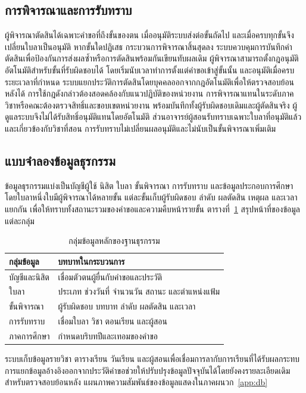 \subsection{การพิจารณาและการรับทราบ}
ผู้พิจารณาตัดสินได้เฉพาะคำขอที่ถึงขั้นของตน
เมื่ออนุมัติระบบส่งต่อขั้นถัดไป
และเมื่อครบทุกขั้นจึงเปลี่ยนใบลาเป็นอนุมัติ หากขั้นใดปฏิเสธ
กระบวนการพิจารณาสิ้นสุดลง
ระบบควบคุมการบันทึกคำตัดสินเพื่อป้องกันการส่งผลซ้ำหรือการตัดสินพร้อมกันเขียนทับผลเดิม
ผู้พิจารณาสามารถตั้งกฎอนุมัติอัตโนมัติสำหรับขั้นที่รับผิดชอบได้
โดยเริ่มนับเวลาทำการตั้งแต่คำขอเข้าสู่ขั้นนั้น
และอนุมัติเมื่อครบระยะเวลาที่กำหนด
ระบบแยกประวัติการตัดสินโดยบุคคลออกจากกฎอัตโนมัติเพื่อให้ตรวจสอบย้อนหลังได้
การใช้กฎดังกล่าวต้องสอดคล้องกับแนวปฏิบัติของหน่วยงาน
การพิจารณาแทนในระดับภาควิชาหรือคณะต้องตรวจสิทธิ์และขอบเขตหน่วยงาน
พร้อมบันทึกทั้งผู้รับผิดชอบเดิมและผู้ตัดสินจริง
ผู้ดูแลระบบจึงไม่ได้รับสิทธิ์อนุมัติแทนโดยอัตโนมัติ
ส่วนอาจารย์ผู้สอนรับทราบเฉพาะใบลาที่อนุมัติแล้วและเกี่ยวข้องกับวิชาที่สอน
การรับทราบไม่เปลี่ยนผลอนุมัติและไม่นับเป็นขั้นพิจารณาเพิ่มเติม
\subsection{แบบจำลองข้อมูลธุรกรรม}
ข้อมูลธุรกรรมแบ่งเป็นบัญชีผู้ใช้ นิสิต ใบลา ขั้นพิจารณา การรับทราบ
และข้อมูลประกอบการศึกษา โดยใบลาหนึ่งใบมีผู้พิจารณาได้หลายขั้น
แต่ละขั้นเก็บผู้รับผิดชอบ ลำดับ ผลตัดสิน เหตุผล และเวลาแยกกัน
เพื่อให้ทราบทั้งสถานะรวมของคำขอและความคืบหน้ารายขั้น
ตารางที่~\ref{tab:operational-model} สรุปหน้าที่ของข้อมูลแต่ละกลุ่ม
\begin{table}[H]
  \caption{กลุ่มข้อมูลหลักของฐานธุรกรรม}\label{tab:operational-model}
  \centering
  \begin{tabularx}{\columnwidth}{|p{23mm}|X|}
    \hline
    กลุ่มข้อมูล & บทบาทในกระบวนการ \\ \hline
    บัญชีและนิสิต & เชื่อมตัวตนผู้ยื่นกับคำขอและประวัติ \\ \hline
    ใบลา & ประเภท ช่วงวันที่ จำนวนวัน สถานะ และตำแหน่งแฟ้ม \\ \hline
    ขั้นพิจารณา & ผู้รับผิดชอบ บทบาท ลำดับ ผลตัดสิน และเวลา \\ \hline
    การรับทราบ & เชื่อมใบลา วิชา ตอนเรียน และผู้สอน \\ \hline
    ภาคการศึกษา & กำหนดบริบทปีและเทอมของคำขอ \\ \hline
  \end{tabularx}
\end{table}
ระบบเก็บข้อมูลรายวิชา ตารางเรียน วันเรียน
และผู้สอนเพื่อเชื่อมการลากับการเรียนที่ได้รับผลกระทบ
การแยกข้อมูลอ้างอิงออกจากประวัติคำขอช่วยให้ปรับปรุงข้อมูลปัจจุบันได้โดยยังคงรายละเอียดเดิมสำหรับตรวจสอบย้อนหลัง
แผนภาพความสัมพันธ์ของข้อมูลแสดงในภาคผนวก~\ref{app:db}
